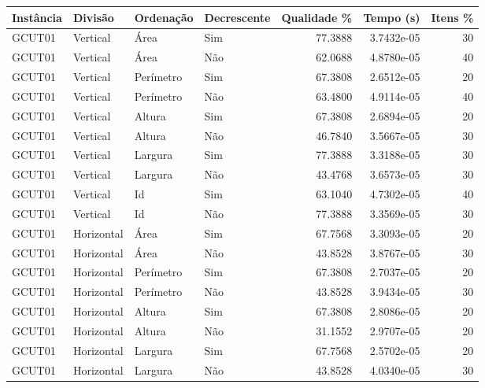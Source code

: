 \begin{tabular}{llllrrr}
    \hline
    Instância & Divisão     & Ordenação & Decrescente & Qualidade \% & Tempo (s)  & Itens \% \\
    \hline
    GCUT01    & Vertical    & Área      & Sim         & 77.3888      & 3.7432e-05 & 30       \\
    GCUT01    & Vertical    & Área      & Não         & 62.0688      & 4.8780e-05 & 40       \\
    GCUT01    & Vertical    & Perímetro & Sim         & 67.3808      & 2.6512e-05 & 20       \\
    GCUT01    & Vertical    & Perímetro & Não         & 63.4800      & 4.9114e-05 & 40       \\
    GCUT01    & Vertical    & Altura    & Sim         & 67.3808      & 2.6894e-05 & 20       \\
    GCUT01    & Vertical    & Altura    & Não         & 46.7840      & 3.5667e-05 & 30       \\
    GCUT01    & Vertical    & Largura   & Sim         & 77.3888      & 3.3188e-05 & 30       \\
    GCUT01    & Vertical    & Largura   & Não         & 43.4768      & 3.6573e-05 & 30       \\
    GCUT01    & Vertical    & Id        & Sim         & 63.1040      & 4.7302e-05 & 40       \\
    GCUT01    & Vertical    & Id        & Não         & 77.3888      & 3.3569e-05 & 30       \\
    GCUT01    & Horizontal  & Área      & Sim         & 67.7568      & 3.3093e-05 & 20       \\
    GCUT01    & Horizontal  & Área      & Não         & 43.8528      & 3.8767e-05 & 30       \\
    GCUT01    & Horizontal  & Perímetro & Sim         & 67.3808      & 2.7037e-05 & 20       \\
    GCUT01    & Horizontal  & Perímetro & Não         & 43.8528      & 3.9434e-05 & 30       \\
    GCUT01    & Horizontal  & Altura    & Sim         & 67.3808      & 2.8086e-05 & 20       \\
    GCUT01    & Horizontal  & Altura    & Não         & 31.1552      & 2.9707e-05 & 20       \\
    GCUT01    & Horizontal  & Largura   & Sim         & 67.7568      & 2.5702e-05 & 20       \\
    GCUT01    & Horizontal  & Largura   & Não         & 43.8528      & 4.0340e-05 & 30       \\

\end{tabular}
